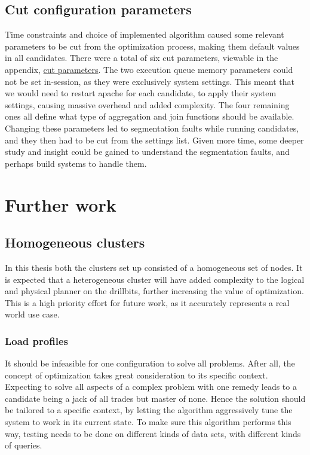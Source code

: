 \documentclass[a4paper,english]{report}
\begin{document}
	\section{Cut configuration parameters}
	Time constraints and choice of implemented algorithm caused some relevant parameters to be cut from the optimization process, making them default values in all candidates. There were a total of six cut parameters, viewable in the appendix, \hyperref[table:removed_params]{cut parameters}. The two execution queue memory parameters could not be set in-session, as they were exclusively system settings. This meant that we would need to restart apache for each candidate, to apply their system settings, causing massive overhead and added complexity. The four remaining ones all define what type of aggregation and join functions should be available. Changing these parameters led to segmentation faults while running candidates, and they then had to be cut from the settings list. Given more time, some deeper study and insight could be gained to understand the segmentation faults, and perhaps build systems to handle them.
	
	\chapter{Further work}
	\section{Homogeneous clusters}
	In this thesis both the clusters set up consisted of a homogeneous set of nodes. It is expected that a heterogeneous cluster will have added complexity to the logical and physical planner on the drillbits, further increasing the value of optimization. This is a high priority effort for future work, as it accurately represents a real world use case.
	\subsection{Load profiles}
	It should be infeasible for one configuration to solve all problems. After all, the concept of optimization takes great consideration to its specific context. Expecting to solve all aspects of a complex problem with one remedy leads to a candidate being a jack of all trades but master of none. Hence the solution should be tailored to a specific context, by letting the algorithm aggressively tune the system to work in its current state. To make sure this algorithm performs this way, testing needs to be done on different kinds of data sets, with different kinds of queries.
\end{document}
